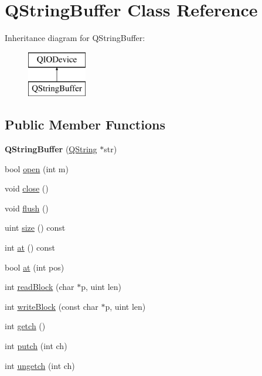 \hypertarget{class_q_string_buffer}{}\section{Q\+String\+Buffer Class Reference}
\label{class_q_string_buffer}
Inheritance diagram for Q\+String\+Buffer\+:\begin{figure}[H]
\begin{center}
\leavevmode
\includegraphics[height=2.000000cm]{class_q_string_buffer}
\end{center}
\end{figure}
\subsection*{Public Member Functions}
\begin{DoxyCompactItemize}
\item 
\mbox{\label{class_q_string_buffer_ab5fe1a964b28565381b6c180e69a9056}} 
{\bfseries Q\+String\+Buffer} (\mbox{\hyperlink{class_q_string}{Q\+String}} $\ast$str)
\item 
bool \mbox{\hyperlink{class_q_string_buffer_a593d2870764f6888dd1aabea55304a46}{open}} (int m)
\item 
void \mbox{\hyperlink{class_q_string_buffer_aabc8736ce1f90cd66212c5a6b2e166ea}{close}} ()
\item 
void \mbox{\hyperlink{class_q_string_buffer_a2961ddd6de68bb9e681ae8e18b6b298b}{flush}} ()
\item 
uint \mbox{\hyperlink{class_q_string_buffer_a914433284831ecca2b30f80a642d175e}{size}} () const
\item 
int \mbox{\hyperlink{class_q_string_buffer_ad5305aacadba80e595b741142f67538e}{at}} () const
\item 
bool \mbox{\hyperlink{class_q_string_buffer_a36caaffb3e157196ce5201f0f7c9fa25}{at}} (int pos)
\item 
int \mbox{\hyperlink{class_q_string_buffer_a6cda82dda018af5291df80676eb037a4}{read\+Block}} (char $\ast$p, uint len)
\item 
int \mbox{\hyperlink{class_q_string_buffer_a4c17bf2b2702b837ba614bd92ad0d7a2}{write\+Block}} (const char $\ast$p, uint len)
\item 
int \mbox{\hyperlink{class_q_string_buffer_acebe86e5beeaff3863673fc56089e2da}{getch}} ()
\item 
int \mbox{\hyperlink{class_q_string_buffer_ac95cff6e837ae523527b9d78cb6a4074}{putch}} (int ch)
\item 
int \mbox{\hyperlink{class_q_string_buffer_ad6e53fb9f2f2969b9f9a7a1daa2d7af2}{ungetch}} (int ch)
\end{DoxyCompactItemize}

